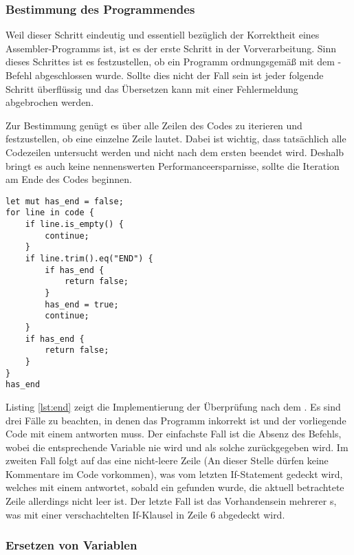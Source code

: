 \subsubsection{Bestimmung des Programmendes}

Weil dieser Schritt eindeutig und essentiell bezüglich der Korrektheit eines Assembler-Programms ist, ist es der erste Schritt in der Vorverarbeitung. Sinn dieses Schrittes ist es festzustellen, ob ein Programm ordnungsgemäß mit dem -Befehl abgeschlossen wurde. Sollte dies nicht der Fall sein ist jeder folgende Schritt überflüssig und das Übersetzen kann mit einer Fehlermeldung abgebrochen werden.

Zur Bestimmung genügt es über alle Zeilen des Codes zu iterieren und festzustellen, ob eine einzelne Zeile  lautet. Dabei ist wichtig, dass tatsächlich alle Codezeilen untersucht werden und nicht nach dem ersten  beendet wird. Deshalb bringt es auch keine nennenswerten Performanceersparnisse, sollte die Iteration am Ende des Codes beginnen. 

\begin{listing}
\begin{verbatim}
let mut has_end = false;
for line in code {
	if line.is_empty() {
		continue;
	}
	if line.trim().eq("END") {
		if has_end {
			return false;
		}
		has_end = true;
		continue;
	}
	if has_end {
		return false;
	}
}
has_end
\end{verbatim}
\label{lst:end}
\end{listing}

Listing \ref{lst:end} zeigt die Implementierung der Überprüfung nach dem . Es sind drei Fälle zu beachten, in denen das Programm inkorrekt ist und der vorliegende Code mit einem  antworten muss. Der einfachste Fall ist die Absenz des Befehls, wobei die entsprechende Variable nie  wird und als solche zurückgegeben wird. Im zweiten Fall folgt auf das  eine nicht-leere Zeile (An dieser Stelle dürfen keine Kommentare im Code vorkommen), was vom letzten If-Statement gedeckt wird, welches mit einem  antwortet, sobald ein  gefunden wurde, die aktuell betrachtete Zeile allerdings nicht leer ist. Der letzte Fall ist das Vorhandensein mehrerer s, was mit einer verschachtelten If-Klausel in Zeile 6 abgedeckt wird.

\subsubsection{Ersetzen von Variablen}

